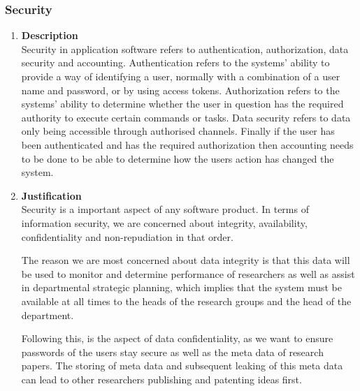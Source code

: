 \documentclass[a4paper,10pt]{article}
\begin{document}
\subsubsection{Security}
\begin{enumerate}
\item \textbf{Description} \\
Security in application software refers to authentication, authorization, data security and accounting. Authentication refers to the systems' ability to provide a way of identifying a user, normally with a combination of a user name and password, or by using access tokens. Authorization refers to the systems' ability to determine whether the user in question has the required authority to execute certain commands or tasks. Data security refers to data only being accessible through authorised channels. Finally if the user has been authenticated and has the required authorization then accounting needs to be done to be able to determine how the users action has changed the system.  
\item \textbf{Justification} \\
Security is a important aspect of any software product. In terms of information security, we are concerned about integrity, availability, confidentiality and non-repudiation in that order. 

The reason we are most concerned about data integrity is that this data will be used to monitor and determine performance of researchers as well as assist in departmental strategic planning, which implies that the system must be available at all times to the heads of the research groups and the head of the department. 

Following this, is the aspect of data confidentiality, as we want to ensure passwords of the users stay secure as well as the meta data of research papers. The storing of meta data and subsequent leaking of this meta data can lead to other researchers publishing and patenting ideas first.


\end{enumerate}
\end{document}

